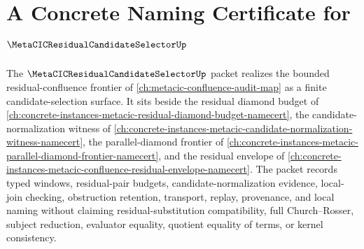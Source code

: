 \chapter{A Concrete Naming Certificate for $\MetaCICResidualCandidateSelectorUp$}
\label{ch:concrete-instances-metacic-residual-candidate-selector-namecert}

The $\MetaCICResidualCandidateSelectorUp$ packet realizes the bounded residual-confluence frontier of \autoref{ch:metacic-confluence-audit-map} as a finite candidate-selection surface. It sits beside the residual diamond budget of \autoref{ch:concrete-instances-metacic-residual-diamond-budget-namecert}, the candidate-normalization witness of \autoref{ch:concrete-instances-metacic-candidate-normalization-witness-namecert}, the parallel-diamond frontier of \autoref{ch:concrete-instances-metacic-parallel-diamond-frontier-namecert}, and the residual envelope of \autoref{ch:concrete-instances-metacic-confluence-residual-envelope-namecert}. The packet records typed windows, residual-pair budgets, candidate-normalization evidence, local-join checking, obstruction retention, transport, replay, provenance, and local naming without claiming residual-substitution compatibility, full Church--Rosser, subject reduction, evaluator equality, quotient equality of terms, or kernel consistency.

